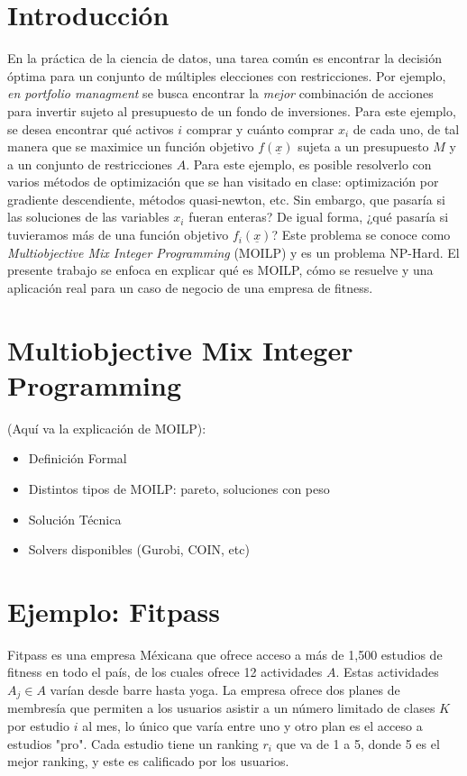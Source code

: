 


\begin{titlepage}

\end{titlepage}

\section{Introducción}

En la práctica de la ciencia de datos, una tarea común es encontrar la decisión óptima para un conjunto de múltiples elecciones con restricciones. Por ejemplo, \textit{en portfolio managment} se busca encontrar la \textit{mejor} combinación de acciones para invertir sujeto al presupuesto de un fondo de inversiones. Para este ejemplo, se desea encontrar qué activos $i$ comprar y cuánto comprar $x_i$ de cada uno, de tal manera que se maximice un función objetivo $f(\underline{x})$ sujeta a un presupuesto $M$ y a un conjunto de restricciones $A$. Para este ejemplo, es posible resolverlo con varios métodos de optimización que se han visitado en clase: optimización por gradiente descendiente, métodos quasi-newton, etc. Sin embargo, que pasaría si las soluciones de las variables $x_i$ fueran enteras? De igual forma, ¿qué pasaría si tuvieramos más de una función objetivo $f_{i}(\underline{x})$? Este problema se conoce como \textit{Multiobjective Mix Integer Programming} (MOILP) y es un problema NP-Hard. El presente trabajo se enfoca en explicar qué es MOILP, cómo se resuelve y una aplicación real para un caso de negocio de una empresa de fitness.

\section{Multiobjective Mix Integer Programming}

(Aquí va la explicación de MOILP):
\begin{itemize}
    \item Definición Formal
    \item Distintos tipos de MOILP: pareto, soluciones con peso
    \item Solución Técnica
    \item Solvers disponibles (Gurobi, COIN, etc)
\end{itemize}

\section{Ejemplo: Fitpass}
Fitpass es una empresa Méxicana que ofrece acceso a más de 1,500 estudios de fitness en todo el país, de los cuales ofrece 12 actividades $A$. Estas actividades $A_{j} \in A$ varían desde barre hasta yoga. La empresa ofrece dos planes de membresía que permiten a los usuarios asistir a un número limitado de clases $K$ por estudio $i$ al mes, lo único que varía entre uno y otro plan es el acceso a estudios "pro". Cada estudio tiene un ranking $r_i$ que va de 1 a 5, donde 5 es el mejor ranking, y este es calificado por los usuarios.

